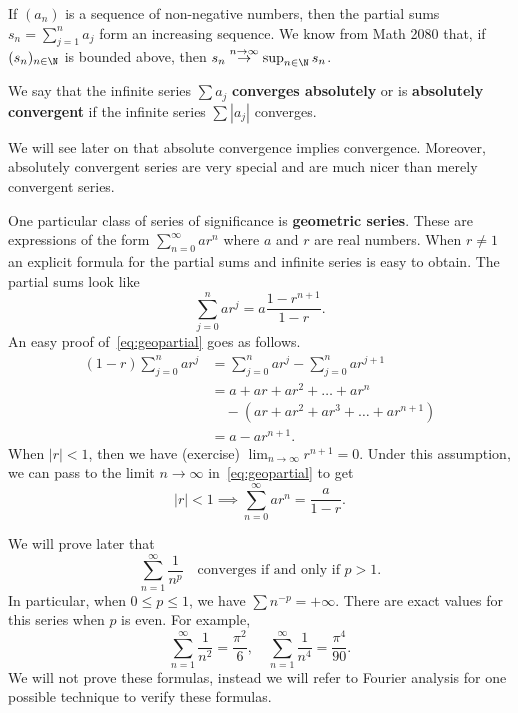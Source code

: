 If $(a_n)$ is a sequence of non-negative numbers, then the partial sums $s_n = \sum_{j=1}^n a_j$ form an increasing sequence. We know from Math 2080 that, if $(s_n)_{n\in\N}$ is bounded above, then $s_n \overset{n\to \infty}{\to}\sup_{n\in\N}s_n$.
\begin{defn}
	\label{defn:abscvgseries}
	We say that the infinite series $\sum a_j$ \textbf{converges absolutely} or is \textbf{absolutely convergent} if the infinite series $\sum |a_j|$ converges.
\end{defn}
We will see later on that absolute convergence implies convergence. Moreover, absolutely convergent series are very special and are much nicer than merely convergent series.
\begin{eg}
	\label{eg:geoseries}
	One particular class of series of significance is \textbf{geometric series}. These are expressions of the form $\sum_{n=0}^\infty ar^n$ where $a$ and $r$ are real numbers. When $r\neq 1$ an explicit formula for the partial sums and infinite series is easy to obtain. The partial sums look like
	\begin{equation}
		\label{eq:geopartial}
		\sum_{j=0}^n ar^j = a\frac{1-r^{n+1}}{1-r}.
	\end{equation}
	An easy proof of~\eqref{eq:geopartial} goes as follows.
	\begin{align*}
		(1-r)\sum_{j=0}^n ar^j &= \sum_{j=0}^n ar^j - \sum_{j=0}^n ar^{j+1} 	\\
		&= a + ar + ar^2 + \dots + ar^n \\
		&\quad - (ar + ar^2 + ar^3 + \dots + ar^{n+1}) 	\\
		&= a - ar^{n+1}.
	\end{align*}
	When $|r|<1$, then we have (exercise) $\lim_{n\to\infty} r^{n+1} =0$. Under this assumption, we can pass to the limit $n\to \infty$ in~\eqref{eq:geopartial} to get
	\begin{equation}
		\label{eq:geoinf}
		|r|<1 \implies \sum_{n=0}^\infty ar^n = \frac{a}{1-r}.
	\end{equation}
\end{eg}
\begin{eg}
	We will prove later that
	\begin{equation}
		\label{eq:powerrecip}
		\sum_{n=1}^\infty \frac{1}{n^p} \quad \text{converges if and only if }p>1.
	\end{equation}
	In particular, when $0 \le p \le 1$, we have $\sum n^{-p}=+\infty$. There are exact values for this series when $p$ is even. For example,
	\[
	\sum_{n=1}^\infty \frac{1}{n^2}=\frac{\pi^2}{6}, \quad \sum_{n=1}^\infty \frac{1}{n^4} = \frac{\pi^4}{90}.
	\]
	We will not prove these formulas, instead we will refer to Fourier analysis for one possible technique to verify these formulas.
\end{eg}
